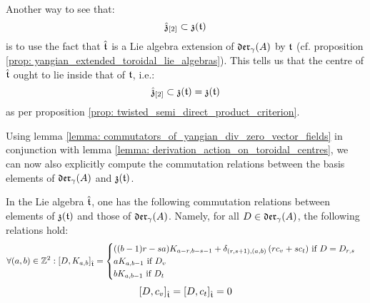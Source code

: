 \begin{remark}
            Another way to see that:
                $$\hat{\mathfrak{z}}_{[2]} \subset \mathfrak{z}(\mathfrak{t})$$
            is to use the fact that $\hat{\mathfrak{t}}$ is a Lie algebra extension of $\mathfrak{der}_{\gamma}(A)$ by $\mathfrak{t}$ (cf. proposition \ref{prop: yangian_extended_toroidal_lie_algebras}). This tells us that the centre of $\hat{\mathfrak{t}}$ ought to lie inside that of $\mathfrak{t}$, i.e.:
                $$\hat{\mathfrak{z}}_{[2]} \subset \mathfrak{z}(\mathfrak{t}) = \mathfrak{z}(\mathfrak{t})$$
            as per proposition \ref{prop: twisted_semi_direct_product_criterion}.
        \end{remark}

        Using lemma \ref{lemma: commutators_of_yangian_div_zero_vector_fields} in conjunction with lemma \ref{lemma: derivation_action_on_toroidal_centres}, we can now also explicitly compute the commutation relations between the basis elements of $\mathfrak{der}_{\gamma}(A)$ and $\mathfrak{z}(\mathfrak{t})$.
        \begin{lemma} \label{lemma: explicit_commutators_between_central_basis_elements_and_derivations}
            In the Lie algebra $\hat{\mathfrak{t}}$, one has the following commutation relations between elements of $\mathfrak{z}(\mathfrak{t})$ and those of $\mathfrak{der}_{\gamma}(A)$. Namely, for all $D \in \mathfrak{der}_{\gamma}(A)$, the following relations hold:
                $$
                    \forall (a, b) \in \mathbb{Z}^2: [D, K_{a, b}]_{\hat{\mathfrak{t}}} =
                    \begin{cases}
                        \text{$((b - 1)r - sa) K_{a - r, b - s - 1} + \delta_{(r, s + 1), (a, b)} \left( r c_v + s c_t \right)$ if $D = D_{r, s}$}
                        \\
                        \text{$a K_{a, b - 1}$ if $D_v$}
                        \\
                        \text{$b K_{a, b - 1}$ if $D_t$}
                    \end{cases}
                $$
                $$[D, c_v]_{\hat{\mathfrak{t}}} = [D, c_t]_{\hat{\mathfrak{t}}} = 0$$
        \end{lemma}
